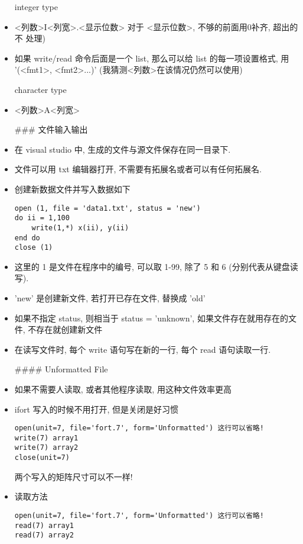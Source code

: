 \begin{itemize}
integer type
\item <列数>I<列宽>.<显示位数>  对于 <显示位数>, 不够的前面用0补齐, 超出的不
   处理)
\item 如果 write/read 命令后面是一个 list, 那么可以给 list 的每一项设置格式, 用 '(<fmt1>, <fmt2>...)'  (我猜测<列数>在该情况仍然可以使用)

character type
\item <列数>A<列宽>

### 文件输入输出
\item 在 visual studio 中, 生成的文件与源文件保存在同一目录下.
\item 文件可以用 txt 编辑器打开, 不需要有拓展名或者可以有任何拓展名.
\item 创建新数据文件并写入数据如下
\begin{lstlisting}
open (1, file = 'data1.txt', status = 'new')
do ii = 1,100
	write(1,*) x(ii), y(ii)
end do
close (1)
\end{lstlisting}
\item 这里的 1 是文件在程序中的编号, 可以取 1-99, 除了 5 和 6 (分别代表从键盘读写).
\item 'new' 是创建新文件, 若打开已存在文件, 替换成 'old'
\item 如果不指定 status, 则相当于 status = 'unknown', 如果文件存在就用存在的文件, 不存在就创建新文件
\item 在读写文件时, 每个 write 语句写在新的一行, 每个 read 语句读取一行.

#### Unformatted File
\item 如果不需要人读取, 或者其他程序读取, 用这种文件效率更高
\item ifort 写入的时候不用打开, 但是关闭是好习惯
\begin{lstlisting}
open(unit=7, file='fort.7', form='Unformatted') 这行可以省略!
write(7) array1
write(7) array2
close(unit=7)
\end{lstlisting}
两个写入的矩阵尺寸可以不一样!

\item 读取方法
\begin{lstlisting}
open(unit=7, file='fort.7', form='Unformatted') 这行可以省略!
read(7) array1
read(7) array2
\end{lstlisting}
\end{itemize}

